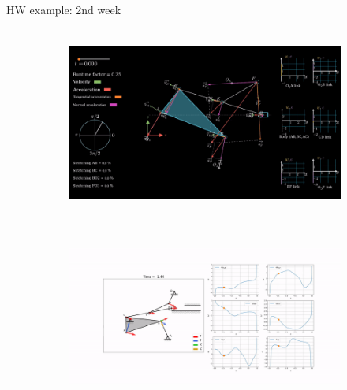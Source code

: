 \documentclass[aspectratio=169,xcolor=table,10pt, notes=hide]{beamer}
\begin{document}
\begin{frame}[c]{HW example: 2nd week}
    \framesubtitle{}
    \begin{figure}[H]
        \begin{subfigure}{0.49\textwidth}
            \centering\includegraphics[height=6cm,width=1\textwidth,keepaspectratio]{image27.png}
        \end{subfigure}
        \begin{subfigure}{0.49\textwidth}
            \centering\includegraphics[height=6cm,width=1\textwidth,keepaspectratio]{image17.png}
        \end{subfigure}

    \end{figure}
\end{frame}
\end{document}
